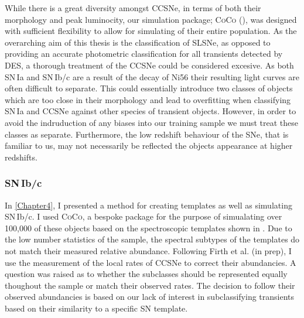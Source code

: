 While there is a great diversity amongst CCSNe, in terms of both their morphology and peak luminocity, our simulation package; \textsc{CoCo} (), was designed with sufficient flexibility to allow for simulating of their entire population. As the overarching aim of this thesis is the classification of SLSNe, as opposed to providing an accurate photometric classification for all transients detected by DES, a thorough treatment of the CCSNe could be considered excesive. As both SN\,Ia and SN\,Ib/c are a result of the decay of Ni56 their resulting light curves are often difficult to separate. This could essentially introduce two classes of objects which are too close in their morphology and lead to overfitting when classifying SN\,Ia and CCSNe against other species of transient objects. However, in order to avoid the indruduction of any biases into our training sample we must treat these classes as separate. Furthermore, the low redshift behaviour of the SNe, that is familiar to us, may not necessarily be reflected the objects appearance at higher redshifts.

\subsubsection{SN\,Ib/c}
In \cref{Chapter4}, I presented a method for creating templates as well as simulating SN\,Ib/c. I used \textsc{CoCo}, a bespoke package for the purpose of simualating over 100,000 of these objects based on the spectroscopic templates shown in . Due to the low number statistics of the sample, the spectral subtypes of the templates do not match their measured relative abundance. Following Firth et al. (in prep), I use the \citet{Li2011} measurement of the local rates of CCSNe to correct their abundancies. A question was raised as to whether the subclasses should be represented equally thoughout the sample or match their observed rates. The decision to follow their observed abundancies is based on our lack of interest in subclassifying transients based on their similarity to a specific SN template.

